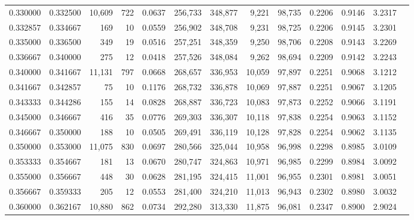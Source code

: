 \begin{tabular}{rrrrrrrrrrrrr}
0.330000 & 0.332500 & 10,609 &   722 &                                     0.0637 & 256,733 & 348,877 &   9,221 &  98,735 & 0.2206 & 0.9146 & 3.2317 \\
0.332857 & 0.334667 &    169 &    10 &                                     0.0559 & 256,902 & 348,708 &   9,231 &  98,725 & 0.2206 & 0.9145 & 3.2301 \\
0.335000 & 0.336500 &    349 &    19 &                                     0.0516 & 257,251 & 348,359 &   9,250 &  98,706 & 0.2208 & 0.9143 & 3.2269 \\
0.336667 & 0.340000 &    275 &    12 &                                     0.0418 & 257,526 & 348,084 &   9,262 &  98,694 & 0.2209 & 0.9142 & 3.2243 \\
0.340000 & 0.341667 & 11,131 &   797 &                                     0.0668 & 268,657 & 336,953 &  10,059 &  97,897 & 0.2251 & 0.9068 & 3.1212 \\
0.341667 & 0.342857 &     75 &    10 &                                     0.1176 & 268,732 & 336,878 &  10,069 &  97,887 & 0.2251 & 0.9067 & 3.1205 \\
0.343333 & 0.344286 &    155 &    14 &                                     0.0828 & 268,887 & 336,723 &  10,083 &  97,873 & 0.2252 & 0.9066 & 3.1191 \\
0.345000 & 0.346667 &    416 &    35 &                                     0.0776 & 269,303 & 336,307 &  10,118 &  97,838 & 0.2254 & 0.9063 & 3.1152 \\
0.346667 & 0.350000 &    188 &    10 &                                     0.0505 & 269,491 & 336,119 &  10,128 &  97,828 & 0.2254 & 0.9062 & 3.1135 \\
0.350000 & 0.353000 & 11,075 &   830 &                                     0.0697 & 280,566 & 325,044 &  10,958 &  96,998 & 0.2298 & 0.8985 & 3.0109 \\
0.353333 & 0.354667 &    181 &    13 &                                     0.0670 & 280,747 & 324,863 &  10,971 &  96,985 & 0.2299 & 0.8984 & 3.0092 \\
0.355000 & 0.356667 &    448 &    30 &                                     0.0628 & 281,195 & 324,415 &  11,001 &  96,955 & 0.2301 & 0.8981 & 3.0051 \\
0.356667 & 0.359333 &    205 &    12 &                                     0.0553 & 281,400 & 324,210 &  11,013 &  96,943 & 0.2302 & 0.8980 & 3.0032 \\
0.360000 & 0.362167 & 10,880 &   862 &                                     0.0734 & 292,280 & 313,330 &  11,875 &  96,081 & 0.2347 & 0.8900 & 2.9024 \\

\end{tabular}
